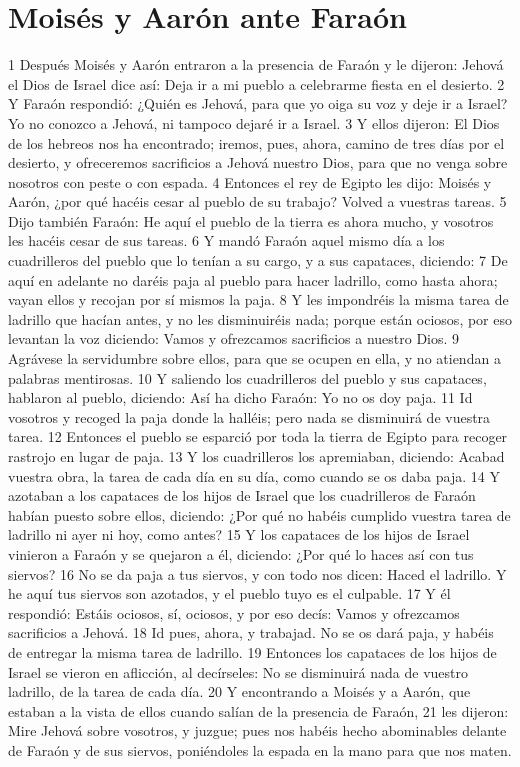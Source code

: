 \section{Moisés y Aarón ante Faraón}
1 Después Moisés y Aarón entraron a la presencia de Faraón y le dijeron: Jehová el Dios de Israel dice así: Deja ir a mi pueblo a celebrarme fiesta en el desierto.
2 Y Faraón respondió: ¿Quién es Jehová, para que yo oiga su voz y deje ir a Israel? Yo no conozco a Jehová, ni tampoco dejaré ir a Israel.
3 Y ellos dijeron: El Dios de los hebreos nos ha encontrado; iremos, pues, ahora, camino de tres días por el desierto, y ofreceremos sacrificios a Jehová nuestro Dios, para que no venga sobre nosotros con peste o con espada.
4 Entonces el rey de Egipto les dijo: Moisés y Aarón, ¿por qué hacéis cesar al pueblo de su trabajo? Volved a vuestras tareas.
5 Dijo también Faraón: He aquí el pueblo de la tierra es ahora mucho, y vosotros les hacéis cesar de sus tareas.
6 Y mandó Faraón aquel mismo día a los cuadrilleros del pueblo que lo tenían a su cargo, y a sus capataces, diciendo:
7 De aquí en adelante no daréis paja al pueblo para hacer ladrillo, como hasta ahora; vayan ellos y recojan por sí mismos la paja.
8 Y les impondréis la misma tarea de ladrillo que hacían antes, y no les disminuiréis nada; porque están ociosos, por eso levantan la voz diciendo: Vamos y ofrezcamos sacrificios a nuestro Dios.
9 Agrávese la servidumbre sobre ellos, para que se ocupen en ella, y no atiendan a palabras mentirosas.
10 Y saliendo los cuadrilleros del pueblo y sus capataces, hablaron al pueblo, diciendo: Así ha dicho Faraón: Yo no os doy paja.
11 Id vosotros y recoged la paja donde la halléis; pero nada se disminuirá de vuestra tarea.
12 Entonces el pueblo se esparció por toda la tierra de Egipto para recoger rastrojo en lugar de paja.
13 Y los cuadrilleros los apremiaban, diciendo: Acabad vuestra obra, la tarea de cada día en su día, como cuando se os daba paja.
14 Y azotaban a los capataces de los hijos de Israel que los cuadrilleros de Faraón habían puesto sobre ellos, diciendo: ¿Por qué no habéis cumplido vuestra tarea de ladrillo ni ayer ni hoy, como antes?
15 Y los capataces de los hijos de Israel vinieron a Faraón y se quejaron a él, diciendo: ¿Por qué lo haces así con tus siervos?
16 No se da paja a tus siervos, y con todo nos dicen: Haced el ladrillo. Y he aquí tus siervos son azotados, y el pueblo tuyo es el culpable.
17 Y él respondió: Estáis ociosos, sí, ociosos, y por eso decís: Vamos y ofrezcamos sacrificios a Jehová.
18 Id pues, ahora, y trabajad. No se os dará paja, y habéis de entregar la misma tarea de ladrillo.
19 Entonces los capataces de los hijos de Israel se vieron en aflicción, al decírseles: No se disminuirá nada de vuestro ladrillo, de la tarea de cada día.
20 Y encontrando a Moisés y a Aarón, que estaban a la vista de ellos cuando salían de la presencia de Faraón,
21 les dijeron: Mire Jehová sobre vosotros, y juzgue; pues nos habéis hecho abominables delante de Faraón y de sus siervos, poniéndoles la espada en la mano para que nos maten.

